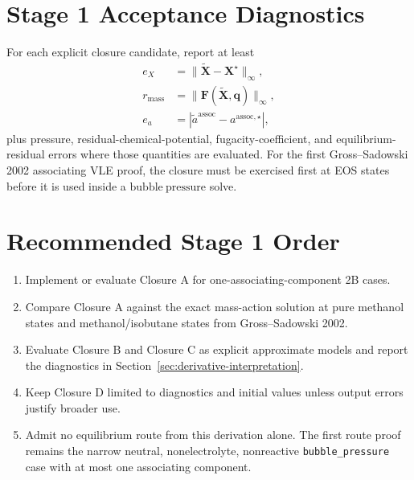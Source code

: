 \documentclass[12pt,letterpaper]{article}
\newcommand{\assoc}{\mathrm{assoc}}
\newcommand{\mass}{\mathrm{mass}}
\begin{document}
\section{Stage 1 Acceptance Diagnostics}

For each explicit closure candidate, report at least
\begin{align}
  e_X &=
  \|\widetilde{\mathbf{X}}-\mathbf{X}^\star\|_{\infty},
  \label{eq:x_error_metric}\\
  r_\mass &=
  \|\mathbf{F}(\widetilde{\mathbf{X}},\mathbf{q})\|_{\infty},
  \label{eq:mass_residual_metric}\\
  e_a &=
  |\widetilde{a}^{\assoc}-a^{\assoc,\star}|,
  \label{eq:a_error_metric}
\end{align}
plus pressure, residual-chemical-potential, fugacity-coefficient, and
equilibrium-residual errors where those quantities are evaluated. For the first
Gross--Sadowski 2002 associating VLE proof, the closure must be exercised first
at EOS states before it is used inside a \(\mathrm{bubble\ pressure}\) solve.

\section{Recommended Stage 1 Order}

\begin{enumerate}
  \item Implement or evaluate Closure A for one-associating-component 2B cases.
  \item Compare Closure A against the exact mass-action solution at pure
        methanol states and methanol/isobutane states from Gross--Sadowski 2002.
  \item Evaluate Closure B and Closure C as explicit approximate models and
        report the diagnostics in Section~\ref{sec:derivative-interpretation}.
  \item Keep Closure D limited to diagnostics and initial values unless output
        errors justify broader use.
  \item Admit no equilibrium route from this derivation alone. The first route
        proof remains the narrow neutral, nonelectrolyte, nonreactive
        \texttt{bubble\_pressure} case with at most one associating
        component.
\end{enumerate}

\printbibliography
\end{document}
